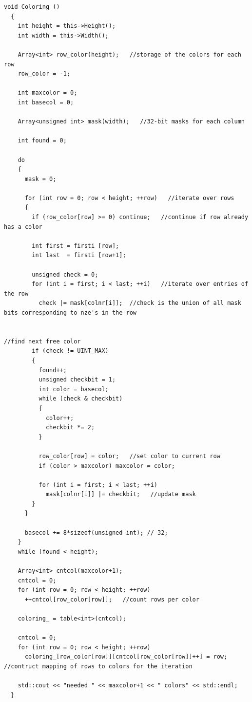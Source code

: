 \documentclass[a4paper,11pt]{scrartcl}
\begin{document}
\begin{lstlisting}
void Coloring ()
  {
    int height = this->Height();
    int width = this->Width();

    Array<int> row_color(height);   //storage of the colors for each row
    row_color = -1;

    int maxcolor = 0;
    int basecol = 0;

    Array<unsigned int> mask(width);   //32-bit masks for each column

    int found = 0;

    do
    {
      mask = 0;

      for (int row = 0; row < height; ++row)   //iterate over rows
      {
        if (row_color[row] >= 0) continue;   //continue if row already has a color

        int first = firsti [row];
        int last  = firsti [row+1];

        unsigned check = 0;
        for (int i = first; i < last; ++i)   //iterate over entries of the row
          check |= mask[colnr[i]];  //check is the union of all mask bits corresponding to nze's in the row


//find next free color
        if (check != UINT_MAX)
        {
          found++;
          unsigned checkbit = 1;
          int color = basecol;
          while (check & checkbit)
          {
            color++;
            checkbit *= 2;
          }

          row_color[row] = color;   //set color to current row
          if (color > maxcolor) maxcolor = color;

          for (int i = first; i < last; ++i)
            mask[colnr[i]] |= checkbit;   //update mask
        }
      }

      basecol += 8*sizeof(unsigned int); // 32;
    }
    while (found < height);

    Array<int> cntcol(maxcolor+1);
    cntcol = 0;
    for (int row = 0; row < height; ++row)
      ++cntcol[row_color[row]];   //count rows per color

    coloring_ = table<int>(cntcol);

    cntcol = 0;
    for (int row = 0; row < height; ++row)
      coloring_[row_color[row]][cntcol[row_color[row]]++] = row;   //contruct mapping of rows to colors for the iteration

    std::cout << "needed " << maxcolor+1 << " colors" << std::endl;
  }

\end{lstlisting}
\end{document}
